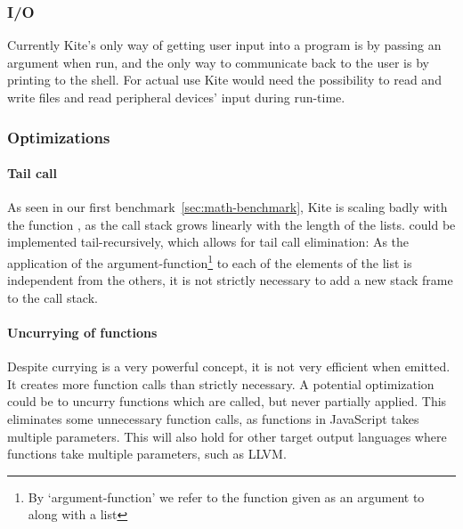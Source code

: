 \subsubsection{I/O}
Currently Kite's only way of getting user input into a program is by passing an argument when run, and the only way to communicate back to the user is by printing to the shell. For actual use Kite would need the possibility to read and write files and read peripheral devices' input during run-time.

\subsubsection{Optimizations}
\label{sec:disc-optimization}

\paragraph{Tail call}
As seen in our first benchmark~\ref{sec:math-benchmark}, Kite is scaling badly with the function , as the call stack grows linearly with the length of the lists.  could be implemented tail-recursively, which allows for tail call elimination: As the application of the argument-function\footnote{By `argument-function' we refer to the function given as an argument to  along with a list} to each of the elements of the list is independent from the others, it is not strictly necessary to add a new stack frame to the call stack.

\paragraph{Uncurrying of functions}
Despite currying is a very powerful concept, it is not very efficient when emitted. It creates more function calls than strictly necessary. A potential optimization could be to uncurry functions which are called, but never partially applied. This eliminates some unnecessary function calls, as functions in JavaScript takes multiple parameters. This will also hold for other target output languages where functions take multiple parameters, such as LLVM.
